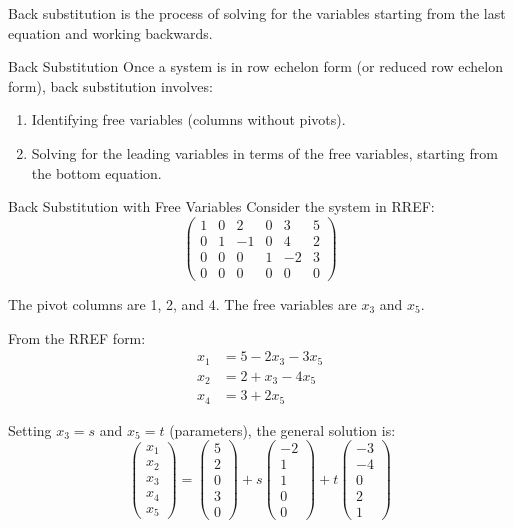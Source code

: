 \documentclass[12pt,a4paper]{article}
\begin{document}
	Back substitution is the process of solving for the variables starting from the last equation and working backwards.
	
	\begin{definition}{Back Substitution}
		Once a system is in row echelon form (or reduced row echelon form), back substitution involves:
		\begin{enumerate}
			\item Identifying free variables (columns without pivots).
			\item Solving for the leading variables in terms of the free variables, starting from the bottom equation.
		\end{enumerate}
	\end{definition}
	
	\begin{example}{Back Substitution with Free Variables}
		Consider the system in RREF:
		\[
		\left(\begin{array}{ccccc|c}
			1 & 0 & 2 & 0 & 3 & 5 \\
			0 & 1 & -1 & 0 & 4 & 2 \\
			0 & 0 & 0 & 1 & -2 & 3 \\
			0 & 0 & 0 & 0 & 0 & 0
		\end{array}\right)
		\]
		
		The pivot columns are 1, 2, and 4. The free variables are $x_3$ and $x_5$.
		
		From the RREF form:
		\begin{align*}
			x_1 &= 5 - 2x_3 - 3x_5 \\
			x_2 &= 2 + x_3 - 4x_5 \\
			x_4 &= 3 + 2x_5
		\end{align*}
		
		Setting $x_3 = s$ and $x_5 = t$ (parameters), the general solution is:
		\[
		\begin{pmatrix} x_1 \\ x_2 \\ x_3 \\ x_4 \\ x_5 \end{pmatrix} = \begin{pmatrix} 5 \\ 2 \\ 0 \\ 3 \\ 0 \end{pmatrix} + s\begin{pmatrix} -2 \\ 1 \\ 1 \\ 0 \\ 0 \end{pmatrix} + t\begin{pmatrix} -3 \\ -4 \\ 0 \\ 2 \\ 1 \end{pmatrix}
		\]
	\end{example}
	
\end{document}
